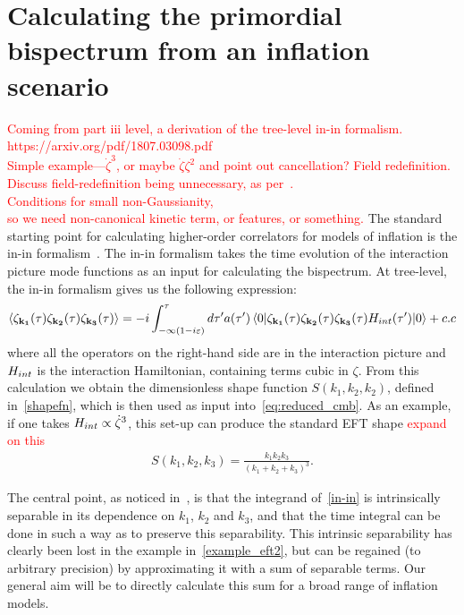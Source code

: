     \section{Calculating the primordial bispectrum from an inflation scenario}
    \textcolor{red}{Coming from part iii level, a derivation of the tree-level in-in formalism.\\
    https://arxiv.org/pdf/1807.03098.pdf\\
    Simple example---$\dot{\zeta}^3$, or maybe $\dot{\zeta}\zeta^2$ and point out cancellation?
    Field redefinition.\\
    Discuss field-redefinition being unnecessary, as per~\cite{px_burrage}.\\
    Conditions for small non-Gaussianity,\\
    so we need non-canonical kinetic term, or features, or something.}
    The standard starting point for calculating
higher-order correlators for models of inflation is the in-in formalism~\cite{Maldacena,weinberg_in_in}.
The in-in formalism takes the time evolution of the interaction picture mode
functions as an input for calculating the bispectrum.
At tree-level, the in-in formalism gives us the
following expression:
\begin{align}
{
    \left< \zeta_{\mathbf{k_1}}(\tau)\zeta_{\mathbf{k_2}}(\tau)\zeta_{\mathbf{k_3}}(\tau) \right>
=-i\int_{-\infty(1-i\varepsilon)}^{\tau}d\tau'a(\tau')
    \left<0\lvert \zeta_{\mathbf{k_1}}(\tau)\zeta_{\mathbf{k_2}}(\tau)\zeta_{\mathbf{k_3}}(\tau)H_{int}(\tau') \rvert0\right>+c.c\label{in-in}
}
\end{align}
where all the operators on the right-hand side are in the interaction picture
and $H_{int}$ is the interaction Hamiltonian, containing terms cubic in $\zeta$.
From this calculation we obtain the dimensionless shape function $S(k_1,k_2,k_2)$,
defined in~\eqref{shapefn},
which is then used as input into~\eqref{eq:reduced_cmb}.
As an example, if one takes $H_{int}\propto\dot{\zeta}^3$, this set-up can produce the standard EFT shape
\textcolor{red}{expand on this}
\begin{align}\label{example_eft2}
    S(k_1, k_2, k_3) = \frac{k_1k_2k_3}{(k_1+k_2+k_3)^3}.
\end{align}

The central point, as noticed in~\cite{Funakoshi}, is that the
integrand of~\eqref{in-in} is intrinsically separable
in its dependence on $k_1$, $k_2$ and $k_3$, and that the time integral
can be done in such a way as to preserve this separability.
This intrinsic separability has clearly been lost in
the example in~\eqref{example_eft2},
but can be regained (to arbitrary precision) by approximating it
with a sum of separable terms. Our general aim will be to directly calculate
this sum for a broad range of inflation models.

